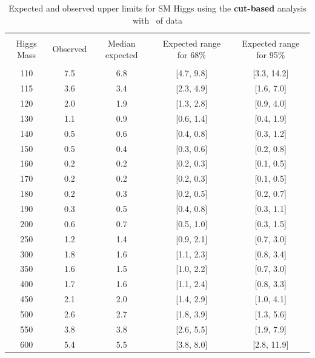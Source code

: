 \begin{table}[!hbp]
\begin{center}
\begin{tabular}{c c c c c}
\hline
\vspace{-3mm} && \\
 Higgs Mass   & Observed & Median expected & Expected range for 68\% & Expected range for 95\%   \\
\vspace{-3mm} && \\
\hline
110 & 7.5 & 6.8 & [4.7, 9.8] & [3.3, 14.2] \\
115 & 3.6 & 3.4 & [2.3, 4.9] & [1.6, 7.0] \\
120 & 2.0 & 1.9 & [1.3, 2.8] & [0.9, 4.0] \\
130 & 1.1 & 0.9 & [0.6, 1.4] & [0.4, 1.9] \\
140 & 0.5 & 0.6 & [0.4, 0.8] & [0.3, 1.2] \\
150 & 0.5 & 0.4 & [0.3, 0.6] & [0.2, 0.8] \\
160 & 0.2 & 0.2 & [0.2, 0.3] & [0.1, 0.5] \\
170 & 0.2 & 0.2 & [0.2, 0.3] & [0.1, 0.5] \\
180 & 0.2 & 0.3 & [0.2, 0.5] & [0.2, 0.7] \\
190 & 0.3 & 0.5 & [0.4, 0.8] & [0.3, 1.1] \\
200 & 0.6 & 0.7 & [0.5, 1.0] & [0.3, 1.5] \\
250 & 1.2 & 1.4 & [0.9, 2.1] & [0.7, 3.0] \\
300 & 1.8 & 1.6 & [1.1, 2.3] & [0.8, 3.4] \\
350 & 1.6 & 1.5 & [1.0, 2.2] & [0.7, 3.0] \\
400 & 1.7 & 1.6 & [1.1, 2.4] & [0.8, 3.3] \\
450 & 2.1 & 2.0 & [1.4, 2.9] & [1.0, 4.1] \\
500 & 2.6 & 2.7 & [1.8, 3.9] & [1.3, 5.6] \\
550 & 3.8 & 3.8 & [2.6, 5.5] & [1.9, 7.9] \\
600 & 5.4 & 5.5 & [3.8, 8.0] & [2.8, 11.9] \\
\hline
\end{tabular}
\caption{Expected and observed upper limits for SM Higgs using the
  {\bf cut-based} analysis with \intlumi\ of data}
\label{tab:cutbase_uls}
\end{center}
\end{table}

